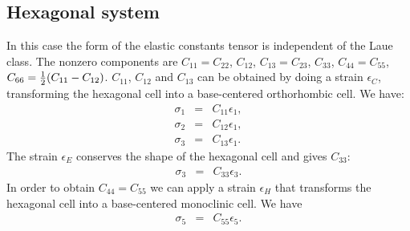 \documentclass[12pt,a4paper]{article}
\begin{document}
\subsection{\color{web-blue}Hexagonal system}
In this case the form of the elastic constants tensor is independent of
the Laue class. The nonzero components are $C_{11}=C_{22}$, $C_{12}$, 
$C_{13}=C_{23}$, $C_{33}$, $C_{44}=C_{55}$, $C_{66}={1\over 2} 
(C_{11}-C_{12})$. 
$C_{11}$, $C_{12}$ and $C_{13}$ can be obtained by doing a strain $\epsilon_C$,
transforming the hexagonal cell into a base-centered orthorhombic
cell. We have:
\begin{eqnarray}
\sigma_1&=&C_{11} \epsilon_1,  \\
\sigma_2&=&C_{12} \epsilon_1,  \\
\sigma_3&=&C_{13} \epsilon_1.
\end{eqnarray}
The strain $\epsilon_E$ conserves the shape of the hexagonal cell and
gives $C_{33}$:
\begin{eqnarray}
\sigma_3&=&C_{33} \epsilon_3.  
\end{eqnarray}
In order to obtain $C_{44}=C_{55}$ we can apply a strain $\epsilon_H$ 
that transforms the hexagonal cell into a base-centered monoclinic cell.
We have
\begin{eqnarray}
\sigma_5&=&C_{55} \epsilon_5. 
\end{eqnarray}
\end{document}
